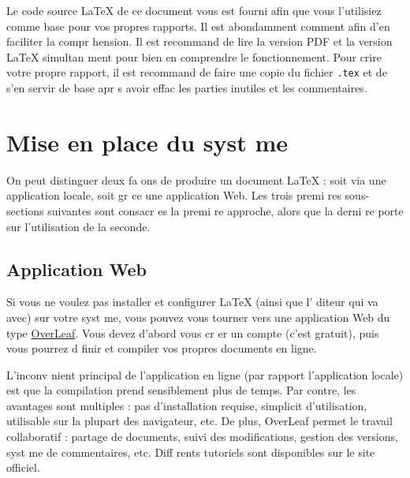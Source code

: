 \documentclass{article}
\begin{document}
Le code source \LaTeX{} de ce document vous est fourni afin que vous l'utilisiez comme base pour vos propres rapports. Il est abondamment comment  afin d'en faciliter la compr hension. Il est recommand  de lire la version PDF et la version \LaTeX{} simultan ment pour bien en comprendre le fonctionnement. Pour  crire votre propre rapport, il est recommand  de faire une copie du fichier \texttt{.tex} et de s'en servir de base apr s avoir effac  les parties inutiles et les commentaires.
	  


\section{Mise en place du syst me}
On peut distinguer deux fa ons de produire un document \LaTeX{} : soit via une application locale, soit gr ce   une application Web. Les trois premi res sous-sections suivantes sont consacr es   la premi re approche, alors que la derni re porte sur l'utilisation de la seconde.

\subsection{Application Web}
Si vous ne voulez pas installer et configurer \LaTeX{} (ainsi que l' diteur qui va avec) sur votre syst me, vous pouvez vous tourner vers une application Web du type \href{https://www.overleaf.com/signup?ref=d62cb1694be6}{OverLeaf}. Vous devez d'abord vous cr er un compte (c'est gratuit), puis vous pourrez d finir et compiler vos propres documents en ligne. 


L'inconv nient principal de l'application en ligne (par rapport   l'application locale) est que la compilation prend sensiblement plus de temps. Par contre, les avantages sont multiples :  pas d'installation requise, simplicit  d'utilisation, utilisable sur la plupart des navigateur, etc. De plus, OverLeaf permet le travail collaboratif : partage de documents, suivi des modifications, gestion des versions, syst me de commentaires, etc. Diff rents tutoriels sont disponibles sur le site officiel.
\end{document}

